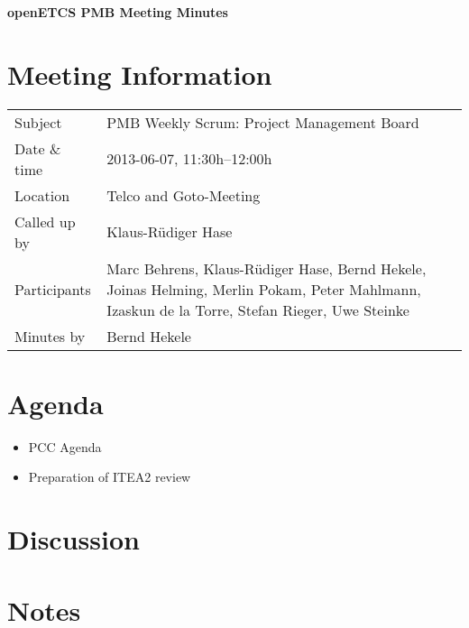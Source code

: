 \documentclass[a4paper, 11pt]{article}
\begin{document}
{\begin{center}\huge\bf openETCS PMB Meeting Minutes\end{center}}
\section{Meeting Information}

\renewcommand{\arraystretch}{1.5}
\begin{supertabular}{m{.2\textwidth}m{.8\textwidth}}
Subject & PMB Weekly Scrum: Project Management Board\\
Date \& time & 2013-06-07, 11:30h--12:00h\\
Location & Telco and Goto-Meeting\\
Called up by & Klaus-R\"udiger Hase\\
Participants &
Marc Behrens,
Klaus-R\"udiger Hase,
Bernd Hekele,
Joinas Helming,
Merlin Pokam,
Peter Mahlmann,
Izaskun de la Torre,
Stefan Rieger,
Uwe Steinke\\

Minutes by & Bernd Hekele\\

\end{supertabular}
\renewcommand{\arraystretch}{1.0}


\section{{Agenda}}
\begin{itemize}
\item PCC Agenda
\item Preparation of ITEA2 review
\end{itemize}

\section{Discussion}

\section{Notes}
\end{document}
